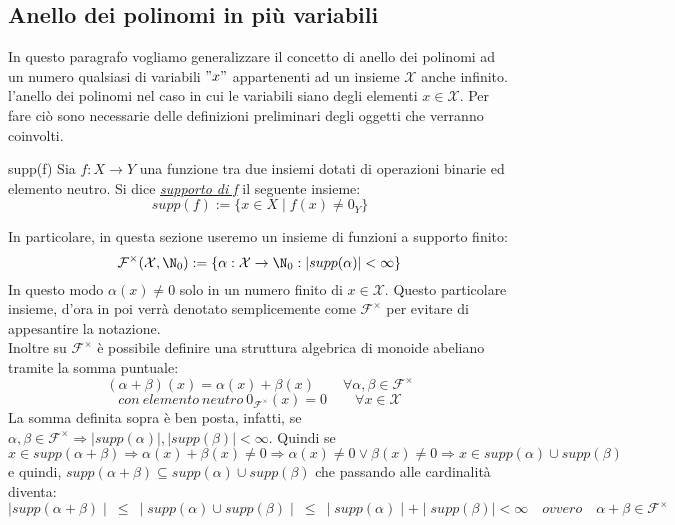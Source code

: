 \subsection{Anello dei polinomi in più variabili}

In questo paragrafo vogliamo generalizzare il concetto di anello dei polinomi ad un numero qualsiasi di variabili $"x"$ appartenenti ad un insieme $\mathcal{X}$ anche infinito.
l'anello dei polinomi nel caso in cui le variabili
siano degli elementi $x \in \mathcal{X}$. Per fare ciò sono necessarie delle definizioni preliminari degli oggetti che verranno coinvolti.

\begin{defn}{supp(f)}
	Sia $f : X \longrightarrow Y$ una funzione tra due insiemi dotati di operazioni binarie ed elemento neutro.
	Si dice \emph{\underline{supporto di f}} il seguente insieme:
	\[supp(f) := \{x \in X \mid f(x) \neq 0_Y\}\]
\end{defn}

\noindent
In particolare, in questa sezione useremo un insieme di funzioni a supporto finito:
\[\mathcal{F}^\times(\mathcal{X},\N_0) := \{\alpha : \mathcal{X} \rightarrow \N_0 : \vert supp(\alpha) \vert < \infty\}\]
In questo modo $\alpha(x) \neq 0$ solo in un numero finito di $x \in \mathcal{X}$. Questo particolare insieme, 
d'ora in poi verrà denotato semplicemente come $\mathcal{F}^\times$ per evitare di appesantire la notazione.\\
Inoltre su $\mathcal{F}^\times$ è possibile definire una struttura algebrica di monoide abeliano tramite la somma puntuale:
\[(\alpha + \beta)(x) = \alpha(x) + \beta(x) \qquad \forall \alpha, \beta \in \mathcal{F}^\times\]
\[con \ elemento \ neutro \ 0_{\mathcal{F}^\times}(x) = 0 \qquad \forall x \in \mathcal{X}\]
La somma definita sopra è ben posta, infatti, se $\alpha, \beta \in \mathcal{F}^\times \Rightarrow \mid
 supp(\alpha) \mid, \mid supp(\beta) \mid < \infty$. Quindi se $x \in supp(\alpha + \beta) \Rightarrow \alpha(x)
  + \beta(x) \neq 0 \Rightarrow \alpha(x) \neq 0 \vee \beta(x) \neq 0 \Rightarrow x \in supp(\alpha) \cup supp(\beta)$ e quindi, 
  $supp(\alpha + \beta) \subseteq supp(\alpha) \cup supp(\beta)$ che passando alle cardinalità diventa:
  \[\mid supp(\alpha + \beta) \mid \ \leq \ \mid supp(\alpha) \cup supp(\beta) \mid \ \leq \ \mid supp(\alpha) \mid + \mid supp(\beta) \mid 
  < \infty \quad ovvero \quad\alpha + \beta \in \mathcal{F}^\times\]

